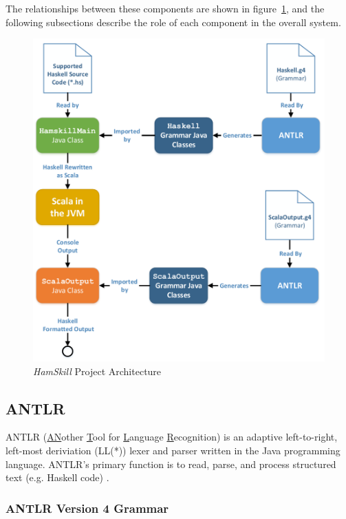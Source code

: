 \documentclass{report}
\begin{document}
The relationships between these components are shown in figure~\ref{fig:hamskillArchitecture}, and the following subsections describe the role of each component in the overall system.

\begin{figure}[ht!]
	\centering
		\includegraphics[width=1.0\textwidth]{images/cs252_project_diagram_cropped.pdf}
	\caption{\textit{HamSkill} Project Architecture}\label{fig:hamskillArchitecture}
\end{figure}

\subsection{ANTLR}

ANTLR (\underline{AN}other \underline{T}ool for \underline{L}anguage \underline{R}ecognition) is an adaptive left-to-right, left-most deriviation (LL(*)) lexer and parser written in the Java programming language.  ANTLR's primary function is to read, parse, and process structured text (e.g. Haskell code) \cite{antlrDefinitiveReference}.  

\subsubsection{ANTLR Version 4 Grammar}
\end{document}
